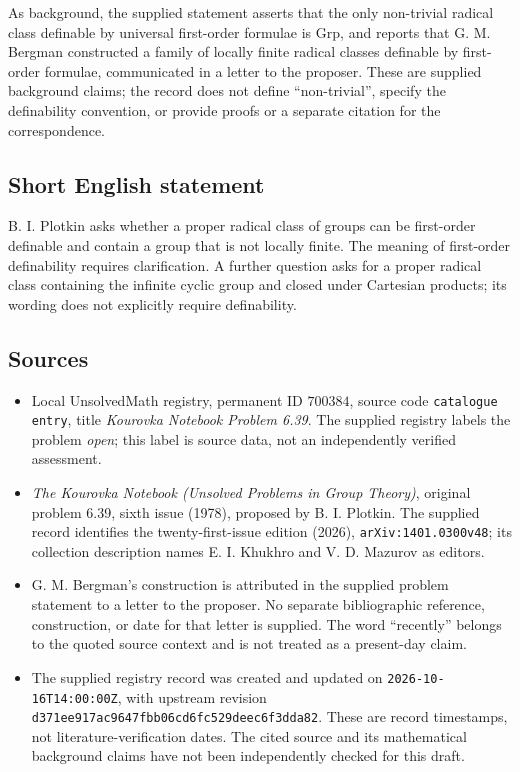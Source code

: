 \documentclass[11pt]{article}
\begin{document}
As background, the supplied statement asserts that the only non-trivial radical class definable by universal first-order formulae is \(\mathrm{Grp}\), and reports that G. M. Bergman constructed a family of locally finite radical classes definable by first-order formulae, communicated in a letter to the proposer. These are supplied background claims; the record does not define ``non-trivial'', specify the definability convention, or provide proofs or a separate citation for the correspondence.
\subsection{Short English statement}
B. I. Plotkin asks whether a proper radical class of groups can be first-order definable and contain a group that is not locally finite. The meaning of first-order definability requires clarification. A further question asks for a proper radical class containing the infinite cyclic group and closed under Cartesian products; its wording does not explicitly require definability.
\subsection{Sources}
\begin{itemize}
\item Local UnsolvedMath registry, permanent ID \(700384\), source code \texttt{catalogue entry}, title \emph{Kourovka Notebook Problem 6.39}. The supplied registry labels the problem \emph{open}; this label is source data, not an independently verified assessment.
\item \emph{The Kourovka Notebook (Unsolved Problems in Group Theory)}, original problem 6.39, sixth issue (1978), proposed by B. I. Plotkin. The supplied record identifies the twenty-first-issue edition (2026), \texttt{arXiv:1401.0300v48}; its collection description names E. I. Khukhro and V. D. Mazurov as editors.
\item G. M. Bergman's construction is attributed in the supplied problem statement to a letter to the proposer. No separate bibliographic reference, construction, or date for that letter is supplied. The word ``recently'' belongs to the quoted source context and is not treated as a present-day claim.
\item The supplied registry record was created and updated on \texttt{2026-10-16T14:00:00Z}, with upstream revision \texttt{d371ee917ac9647fbb06cd6fc529deec6f3dda82}. These are record timestamps, not literature-verification dates. The cited source and its mathematical background claims have not been independently checked for this draft.
\end{itemize}
\end{document}
